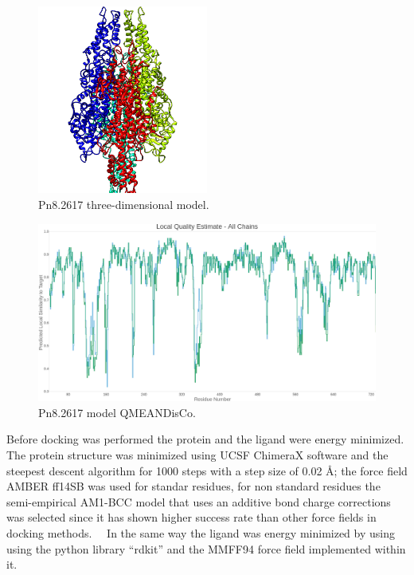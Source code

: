 \documentclass[12pt]{article}
\begin{document}
	
	\FloatBarrier
	\begin{figure}[H]
		\centering
		\includegraphics[width=0.5\textwidth]{../1/Minimize/model.png}
		\caption{Pn8.2617 three-dimensional model.}
		\label{fig1_1}
	\end{figure}
	\FloatBarrier
	
	\FloatBarrier
	\begin{figure}[H]
		\centering
		\includegraphics[width=\textwidth-50pt]{../1/Swiss/Local_quality_estimate.png}
		\caption{Pn8.2617 model QMEANDisCo.}
		\label{fig1_2}
	\end{figure}
	\FloatBarrier
	
	Before docking was performed the protein and the ligand were energy minimized. The protein structure was minimized using UCSF ChimeraX software \cite{chimera,chimera_2} and the steepest descent algorithm for 1000 steps with a step size of 0.02 \r{A}; the force field AMBER ff14SB was used for standar residues, for non standard residues the semi-empirical AM1-BCC model that uses an additive bond charge corrections was selected since it has shown higher success rate than other force fields in docking methods. \cite{am1_bcc,am1_bcc_2,am1_bcc_3}\ \ In the same way the ligand was energy minimized by using using the python library ``rdkit'' and the MMFF94 force field implemented within it. \cite{rdkit,rdkit_mmff}
	
\end{document}
